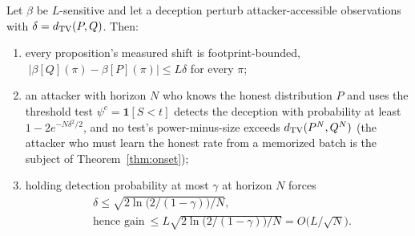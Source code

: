 \begin{theorem}\label{thm:patch}
Let $\beta$ be $L$-sensitive and let a deception perturb attacker-accessible
observations with $\delta=d_{\mathrm{TV}}(P,Q)$. Then:
\begin{enumerate}[label=(\roman*),leftmargin=2em]
\item every proposition's measured shift is footprint-bounded,
      $\;|\beta[Q](\pi)-\beta[P](\pi)|\le L\delta$ for every $\pi$;
\item an attacker with horizon $N$ who knows the honest distribution $P$ and
      uses the threshold test $\psi^{c}=\mathbf{1}[S<t]$ detects the
      deception with probability at least $1-2e^{-N\delta^{2}/2}$, and no
      test's power-minus-size exceeds $d_{\mathrm{TV}}(P^{N},Q^{N})$ (the attacker who
      must learn the honest rate from a memorized batch is the subject of
      Theorem~\ref{thm:onset});
\item holding detection probability at most $\gamma$ at horizon $N$ forces
      \[
      \begin{aligned}
      &\delta\le\sqrt{2\ln\bigl(2/(1-\gamma)\bigr)/N},\\
      &\text{hence gain}\ \le L\sqrt{2\ln\bigl(2/(1-\gamma)\bigr)/N}
      =O\bigl(L/\sqrt N\bigr).
      \end{aligned}
      \]
\end{enumerate}
\end{theorem}


